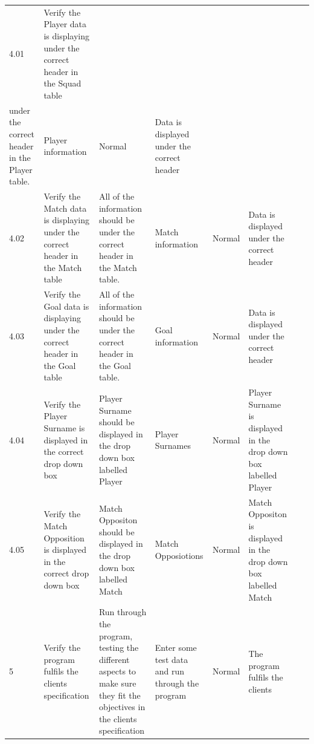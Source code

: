 \begin{table}[]
\begin{longtable}{|p{1cm}|p{2.5cm}|p{2.5cm}|p{1.5cm}|p{1.5cm}|p{2cm}|p{1cm}|p{1cm}|}
4.01 & Verify the Player data is displaying under the correct header in the Squad table & \begin{tabular}[c]{@{}l@{}}All of the information should be \\ under the correct header in the Player table.\end{tabular} & Player information & Normal & Data is displayed under the correct header &  &  \\ \hline
4.02 & Verify the Match data is displaying under the correct header in the Match table & All of the information should be under the correct header in the Match table. & Match information & Normal & Data is displayed under the correct header &  &  \\ \hline
4.03 & Verify the Goal data is displaying under the correct header in the Goal table & All of the information should be under the correct header in the Goal table. & Goal information & Normal & Data is displayed under the correct header &  &  \\ \hline
4.04 & Verify the Player Surname is displayed in the correct drop down box & Player Surname should be displayed in the drop down box labelled Player & Player Surnames & Normal & Player Surname is displayed in the drop down box labelled Player &  &  \\ \hline
4.05 & Verify the Match Opposition is displayed in the correct drop down box & Match Oppositon should be displayed in the drop down box labelled Match & Match Opposiotions & Normal & Match Oppositon is displayed in the drop down box labelled Match &  &  \\ \hline
5 & Verify the program fulfils the clients specification & Run through the program, testing the different aspects to make sure they fit the objectives in the clients specification & Enter some test data and run through the program & Normal & The program fulfils the clients &  &  \\ \hline
\end{longtable}
\end{table}
